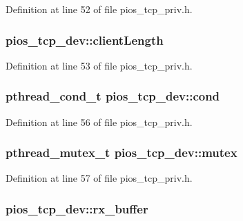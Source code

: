 Definition at line 52 of file pios\-\_\-tcp\-\_\-priv.\-h.

\hypertarget{structpios__tcp__dev_ac4edcb8435a672cf41c471471f456020}{
\subsubsection[{client\-Length}]{ pios\-\_\-tcp\-\_\-dev\-::client\-Length}}\label{structpios__tcp__dev_ac4edcb8435a672cf41c471471f456020}


Definition at line 53 of file pios\-\_\-tcp\-\_\-priv.\-h.

\hypertarget{structpios__tcp__dev_acae1aceab374a5fe741229c030477e7f}{
\subsubsection[{cond}]{\setlength{\rightskip}{0pt plus 5cm}pthread\-\_\-cond\-\_\-t pios\-\_\-tcp\-\_\-dev\-::cond}}\label{structpios__tcp__dev_acae1aceab374a5fe741229c030477e7f}


Definition at line 56 of file pios\-\_\-tcp\-\_\-priv.\-h.

\hypertarget{structpios__tcp__dev_a227fec9048d1a386a5a7baf208bbbd09}{
\subsubsection[{mutex}]{\setlength{\rightskip}{0pt plus 5cm}pthread\-\_\-mutex\-\_\-t pios\-\_\-tcp\-\_\-dev\-::mutex}}\label{structpios__tcp__dev_a227fec9048d1a386a5a7baf208bbbd09}


Definition at line 57 of file pios\-\_\-tcp\-\_\-priv.\-h.

\hypertarget{structpios__tcp__dev_ae514c540c1d91177a04c4e6042136a0e}{
\subsubsection[{rx\-\_\-buffer}]{ pios\-\_\-tcp\-\_\-dev\-::rx\-\_\-buffer}}\label{structpios__tcp__dev_ae514c540c1d91177a04c4e6042136a0e}


